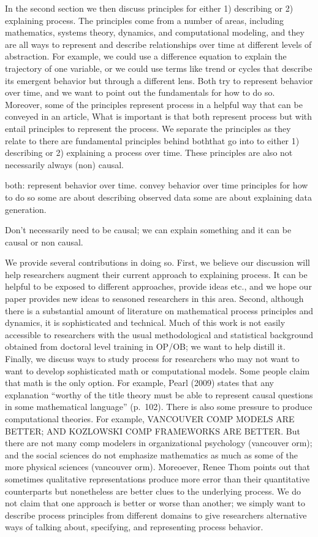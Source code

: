 \documentclass[english,,man]{apa6}
\theoremstyle{definition}
\theoremstyle{definition}
\theoremstyle{definition}
\theoremstyle{remark}
\begin{document}
In the second section we then discuss principles for either 1)
describing or 2) explaining process. The principles come from a number
of areas, including mathematics, systems theory, dynamics, and
computational modeling, and they are all ways to represent and describe
relationships over time at different levels of abstraction. For example,
we could use a difference equation to explain the trajectory of one
variable, or we could use terms like trend or cycles that describe its
emergent behavior but through a different lens. Both try to represent
behavior over time, and we want to point out the fundamentals for how to
do so. Moreover, some of the principles represent process in a helpful
way that can be conveyed in an article, What is important is that both
represent process but with entail principles to represent the process.
We separate the principles as they relate to there are fundamental
principles behind boththat go into to either 1) describing or 2)
explaining a process over time. These principles are also not
necessarily always (non) causal.

both: represent behavior over time. convey behavior over time principles
for how to do so some are about describing observed data some are about
explaining data generation.

Don't necessarily need to be causal; we can explain something and it can
be causal or non causal.

We provide several contributions in doing so. First, we believe our
discussion will help researchers augment their current approach to
explaining process. It can be helpful to be exposed to different
approaches, provide ideas etc., and we hope our paper provides new ideas
to seasoned researchers in this area. Second, although there is a
substantial amount of literature on mathematical process principles and
dynamics, it is sophisticated and technical. Much of this work is not
easily accessible to researchers with the usual methodological and
statistical background obtained from doctoral level training in OP/OB;
we want to help distill it. Finally, we discuss ways to study process
for researchers who may not want to want to develop sophisticated math
or computational models. Some people claim that math is the only option.
For example, Pearl (2009) states that any explanation \enquote{worthy of
the title theory must be able to represent causal questions in some
mathematical language} (p.~102). There is also some pressure to produce
computational theories. For example, VANCOUVER COMP MODELS ARE BETTER;
AND KOZLOWSKI COMP FRAMEWORKS ARE BETTER. But there are not many comp
modelers in organizational psychology (vancouver orm); and the social
sciences do not emphasize mathematics as much as some of the more
physical sciences (vancouver orm). Moreoever, Renee Thom points out that
sometimes qualitative representations produce more error than their
quantitative counterparts but nonetheless are better clues to the
underlying process. We do not claim that one approach is better or worse
than another; we simply want to describe process principles from
different domains to give researchers alternative ways of talking about,
specifying, and representing process behavior.
\end{document}
